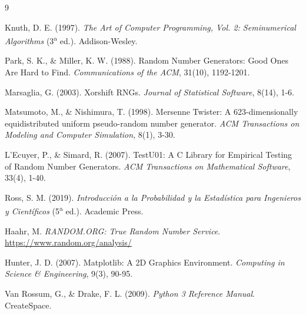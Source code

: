 \documentclass[11pt]{article}
\begin{document}
\begin{thebibliography}{9}

Knuth, D. E. (1997). \emph{The Art of Computer Programming, Vol. 2:
Seminumerical Algorithms} (3\textsuperscript{a} ed.). Addison-Wesley.

Park, S. K., \& Miller, K. W. (1988). Random Number Generators: Good Ones
Are Hard to Find. \emph{Communications of the ACM}, 31(10), 1192-1201.

Marsaglia, G. (2003). Xorshift RNGs. \emph{Journal of Statistical
Software}, 8(14), 1-6.

Matsumoto, M., \& Nishimura, T. (1998). Mersenne Twister: A
623-dimensionally equidistributed uniform pseudo-random number generator.
\emph{ACM Transactions on Modeling and Computer Simulation}, 8(1), 3-30.

L'Ecuyer, P., \& Simard, R. (2007). TestU01: A C Library for Empirical
Testing of Random Number Generators. \emph{ACM Transactions on
Mathematical Software}, 33(4), 1-40.

Ross, S. M. (2019). \emph{Introducci\'on a la Probabilidad y la
Estad\'istica para Ingenieros y Cient\'ificos} (5\textsuperscript{a}
ed.). Academic Press.

Haahr, M. \emph{RANDOM.ORG: True Random Number Service}.
\url{https://www.random.org/analysis/}

Hunter, J. D. (2007). Matplotlib: A 2D Graphics Environment.
\emph{Computing in Science \& Engineering}, 9(3), 90-95.

Van Rossum, G., \& Drake, F. L. (2009). \emph{Python 3 Reference
Manual}. CreateSpace.

\end{thebibliography}
\end{document}
